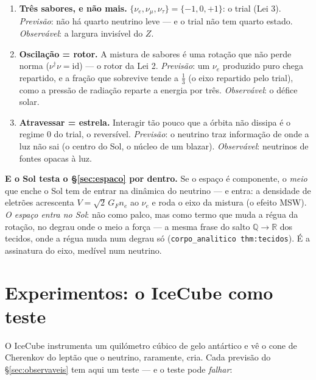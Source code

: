 \documentclass[11pt,a4paper]{article}
\newcommand{\code}[1]{\texttt{\small #1}}
\newcommand{\dg}{^{\dagger}}
\newcommand{\nue}{\nu_e}\newcommand{\num}{\nu_\mu}\newcommand{\nut}{\nu_\tau}
\begin{document}
\begin{enumerate}\itemsep3pt
\item \textbf{Três sabores, e não mais.} $\{\nue,\num,\nut\}=\{-1,0,+1\}$: o trial (Lei 3). \emph{Previsão}:
  não há quarto neutrino leve --- e o trial não tem quarto estado. \emph{Observável}: a largura invisível
  do $Z$.
\item \textbf{Oscilação = rotor.} A mistura de sabores é uma rotação que não perde norma ($\nu\dg\nu=
  \mathrm{id}$) --- o rotor da Lei 2. \emph{Previsão}: um $\nue$ produzido puro chega repartido, e a fração
  que sobrevive tende a $\tfrac13$ (o eixo repartido pelo trial), como a pressão de radiação reparte a
  energia por três. \emph{Observável}: o défice solar.
\item \textbf{Atravessar = estrela.} Interagir tão pouco que a órbita não dissipa é o regime $0$ do trial,
  o reversível. \emph{Previsão}: o neutrino traz informação de onde a luz não sai (o centro do Sol, o
  núcleo de um blazar). \emph{Observável}: neutrinos de fontes opacas à luz.
\end{enumerate}

\noindent \textbf{E o Sol testa o \S\ref{sec:espaco} por dentro.} Se o espaço é componente, o \emph{meio}
que enche o Sol tem de entrar na dinâmica do neutrino --- e entra: a densidade de eletrões acrescenta
$V=\sqrt2\,G_F n_e$ ao $\nue$ e roda o eixo da mistura (o efeito MSW). \emph{O espaço entra no Sol}: não
como palco, mas como termo que muda a régua da rotação, no degrau onde o meio a força --- a mesma frase do
salto $\mathbb{Q}\to\mathbb{R}$ dos tecidos, onde a régua muda num degrau só (\code{corpo\_analitico
thm:tecidos}). É a assinatura do eixo, medível num neutrino.

\section{Experimentos: o IceCube como teste}\label{sec:icecube}

O IceCube instrumenta um quilómetro cúbico de gelo antártico e vê o cone de Cherenkov do leptão que o
neutrino, raramente, cria. Cada previsão do \S\ref{sec:observaveis} tem aqui um teste --- e o teste pode
\emph{falhar}:
\end{document}
